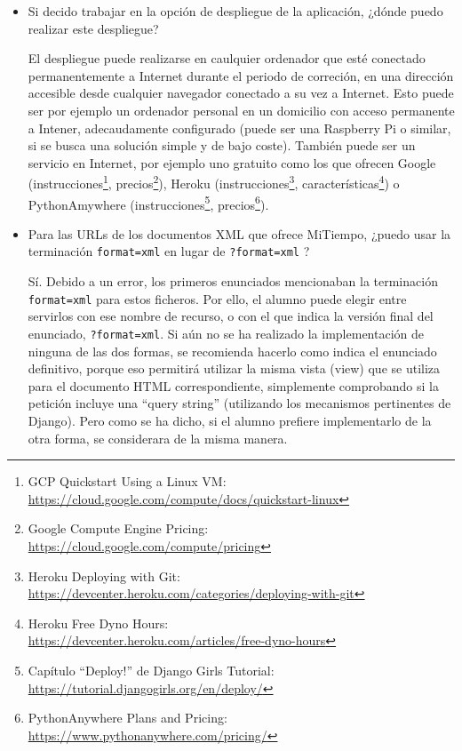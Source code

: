 \begin{itemize}
\item Si decido trabajar en la opción de despliegue de la aplicación, ¿dónde puedo realizar este despliegue?

  El despliegue puede realizarse en caulquier ordenador que esté conectado permanentemente a Internet durante el periodo de correción, en una dirección accesible desde cualquier navegador conectado a su vez a Internet. Esto puede ser por ejemplo un ordenador personal en un domicilio con acceso permanente a Intener, adecaudamente configurado (puede ser una Raspberry Pi o similar, si se busca una solución simple y de bajo coste). También puede ser un servicio en Internet, por ejemplo uno gratuito como los que ofrecen Google (instrucciones\footnote{GCP Quickstart Using a Linux VM:\\ \url{https://cloud.google.com/compute/docs/quickstart-linux}}, precios\footnote{Google Compute Engine Pricing:\\ \url{https://cloud.google.com/compute/pricing}}), Heroku (instrucciones\footnote{Heroku Deploying with Git:\\ \url{https://devcenter.heroku.com/categories/deploying-with-git}}, características\footnote{Heroku Free Dyno Hours:\\ \url{https://devcenter.heroku.com/articles/free-dyno-hours}}) o PythonAmywhere (instrucciones\footnote{Capítulo ``Deploy!'' de Django Girls Tutorial:\\ \url{https://tutorial.djangogirls.org/en/deploy/}}, precios\footnote{PythonAnywhere Plans and Pricing:\\ \url{https://www.pythonanywhere.com/pricing/}}).

\item Para las URLs de los documentos XML que ofrece MiTiempo, ¿puedo usar la terminación \verb|format=xml| en lugar de \verb|?format=xml| ?

  Sí. Debido a un error, los primeros enunciados mencionaban la terminación \verb|format=xml| para estos ficheros. Por ello, el alumno puede elegir entre servirlos con ese nombre de recurso, o con el que indica la versión final del enunciado, \verb|?format=xml|. Si aún no se ha realizado la implementación de ninguna de las dos formas, se recomienda hacerlo como indica el enunciado definitivo, porque eso permitirá utilizar la misma vista (view) que se utiliza para el documento HTML correspondiente, simplemente comprobando si la petición incluye una ``query string'' (utilizando los mecanismos pertinentes de Django). Pero como se ha dicho, si el alumno prefiere implementarlo de la otra forma, se considerara de la misma manera.
\end{itemize}
